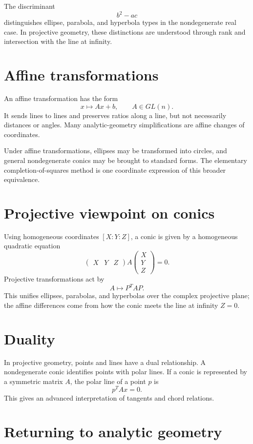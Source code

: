 The discriminant
\[
  b^2-ac
\]
distinguishes ellipse, parabola, and hyperbola types in the nondegenerate real case.  In projective geometry, these distinctions are understood through rank and intersection with the line at infinity.

\section{Affine transformations}

An affine transformation has the form
\[
  x\mapsto Ax+b,\qquad A\in GL(n).
\]
It sends lines to lines and preserves ratios along a line, but not necessarily distances or angles.  Many analytic-geometry simplifications are affine changes of coordinates.

Under affine transformations, ellipses may be transformed into circles, and general nondegenerate conics may be brought to standard forms.  The elementary completion-of-squares method is one coordinate expression of this broader equivalence.

\section{Projective viewpoint on conics}

Using homogeneous coordinates $[X:Y:Z]$, a conic is given by a homogeneous quadratic equation
\[
  \begin{pmatrix}X&Y&Z\end{pmatrix}A\begin{pmatrix}X\\Y\\Z\end{pmatrix}=0.
\]
Projective transformations act by
\[
  A\mapsto P^TAP.
\]
This unifies ellipses, parabolas, and hyperbolas over the complex projective plane; the affine differences come from how the conic meets the line at infinity $Z=0$.

\section{Duality}

In projective geometry, points and lines have a dual relationship.  A nondegenerate conic identifies points with polar lines.  If a conic is represented by a symmetric matrix $A$, the polar line of a point $p$ is
\[
  p^TAx=0.
\]
This gives an advanced interpretation of tangents and chord relations.

\section{Returning to analytic geometry}

